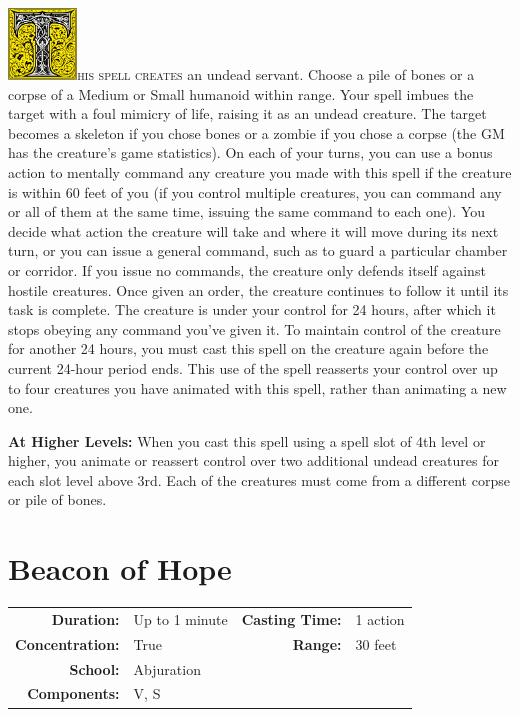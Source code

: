 \documentclass[12pt,showtrims]{memoir}
\begin{document}
\vspace{1\baselineskip}\noindent
\lettrine[lines=4]{\includegraphics[height=54pt]{initials/T.png}}{his spell creates} an undead servant. Choose a pile of bones or a corpse of a Medium or Small humanoid within range. Your spell imbues the target with a foul mimicry of life, raising it as an undead creature. The target becomes a skeleton if you chose bones or a zombie if you chose a corpse (the GM has the creature's game statistics). On each of your turns, you can use a bonus action to mentally command any creature you made with this spell if the creature is within 60 feet of you (if you control multiple creatures, you can command any or all of them at the same time, issuing the same command to each one). You decide what action the creature will take and where it will move during its next turn, or you can issue a general command, such as to guard a particular chamber or corridor. If you issue no commands, the creature only defends itself against hostile creatures. Once given an order, the creature continues to follow it until its task is complete. The creature is under your control for 24 hours, after which it stops obeying any command you've given it. To maintain control of the creature for another 24 hours, you must cast this spell on the creature again before the current 24-hour period ends. This use of the spell reasserts your control over up to four creatures you have animated with this spell, rather than animating a new one.

\vspace{8pt} \noindent\textbf{At Higher Levels:} When you cast this spell using a spell slot of 4th level or higher, you animate or reassert control over two additional undead creatures for each slot level above 3rd. Each of the creatures must come from a different corpse or pile of bones.
\newpage
\section*{Beacon of Hope}

{
\small\centering\vspace{-6pt}
\begin{tabular}{rlrl}
\toprule

\textbf{Duration:} & Up to 1 minute &
\textbf{Casting Time:} & 1 action \\
\textbf{Concentration:} & True &
\textbf{Range:} & 30 feet \\
\textbf{School:} & Abjuration \\
\textbf{Components:} & \multicolumn{3}{p{0.7\textwidth}}{V, S}\\

\bottomrule
\end{tabular}
}
\end{document}
